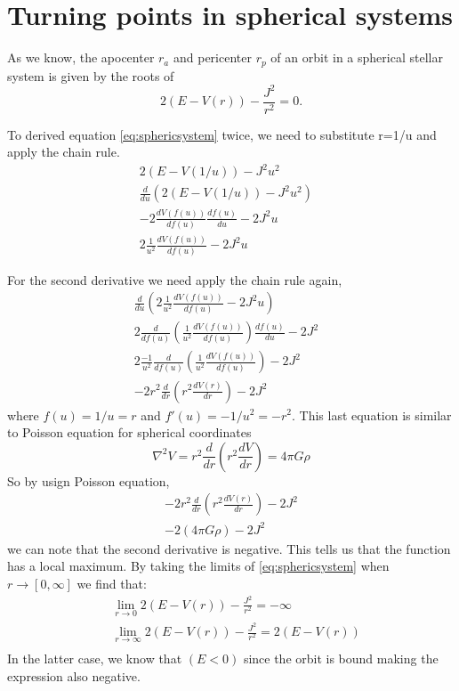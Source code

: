 \section{Turning points in spherical systems}

As we know, the apocenter $r_a$ and pericenter $r_p$ of an orbit in a spherical stellar system is given by the roots of
\begin{equation}
    2(E -V(r))- \frac{J^2}{r^2}= 0.
    \label{eq:sphericsystem}
\end{equation} 

To derived equation \ref{eq:sphericsystem} twice, we need to substitute r=1/u and apply the chain rule.
\begin{align*}
    2(E -V(1/u)) - J^2u^2&\\
    \frac{d}{du}\left( 2(E -V(1/u)) - J^2u^2 \right)&\\
    -2 \frac{dV(f(u))}{df(u)}\frac{df(u)}{du} - 2J^2u&\\
    2 \frac{1}{u^2}\frac{dV(f(u))}{df(u)} - 2J^2u&
\end{align*}

For the second derivative we need apply the chain rule again, 
\begin{align*}
    \frac{d}{du}\left(2 \frac{1}{u^2}\frac{dV(f(u))}{df(u)} - 2J^2u \right) &\\
    2 \frac{d}{df(u)}\left(\frac{1}{u^2}\frac{dV(f(u))}{df(u)}\right)\frac{df(u)}{du} - 2J^2 &\\
    2 \frac{-1}{u^2}\frac{d}{df(u)}\left(\frac{1}{u^2}\frac{dV(f(u))}{df(u)}\right) - 2J^2 &\\
    -2 r^2 \frac{d}{dr}\left(r^2\frac{dV(r)}{dr}\right) - 2J^2&
\end{align*}
where $f(u)=1/u=r$ and $f'(u)=-1/u^2=-r^2$.
This last equation is similar to Poisson equation for spherical coordinates
\begin{equation}
    \nabla^2 V= r^2\frac{d}{dr}\left(r^2\frac{dV}{dr}\right) = 4\pi G\rho
\end{equation}
So by usign Poisson equation,
\begin{align*}
    -2 r^2 \frac{d}{dr}\left(r^2\frac{dV(r)}{dr}\right) - 2J^2 \\
    -2 (4\pi G\rho) - 2J^2
\end{align*}
we can note that the second derivative is negative. This tells us that the function has a local maximum. By taking the limits of \ref{eq:sphericsystem} when $r\to [0,\infty]$ we find that:
\begin{align*}
    &\lim_{r\to 0} 2(E -V(r))- \frac{J^2}{r^2}= -\infty\\
    &\lim_{r\to\infty} 2(E -V(r))- \frac{J^2}{r^2}=2(E -V(r))\\
\end{align*}
In the latter case, we know that $(E < 0)$ since the orbit is bound making the expression also negative.

